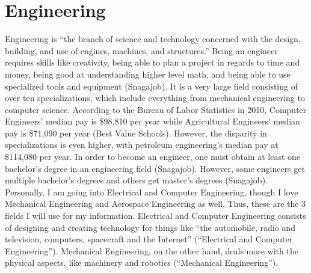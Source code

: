 \chapter{Engineering}

Engineering is “the branch of science and technology concerned with the design, building, and use of engines, machines, and structures.” Being an engineer requires skills like creativity, being able to plan a project in regards to time and money, being good at understanding higher level math, and being able to use specialized tools and equipment (Snagajob). It is a very large field consisting of over ten specializations, which include everything from mechanical engineering to computer science. According to the Bureau of Labor Statistics in 2010, Computer Engineers’ median pay is \$98,810 per year while Agricultural Engineers’ median pay is \$71,090 per year (Best Value Schools). However, the disparity in specializations is even higher, with petroleum engineering’s median pay at \$114,080 per year. In order to become an engineer, one must obtain at least one bachelor’s degree in an engineering field (Snagajob). However, some engineers get multiple bachelor’s degrees and others get master’s degrees (Snagajob). Personally, I am going into Electrical and Computer Engineering, though I love Mechanical Engineering and Aerospace Engineering as well. Thus, these are the 3 fields I will use for my information. Electrical and Computer Engineering consists of designing and creating technology for things like “the automobile, radio and television, computers, spacecraft and the Internet” (“Electrical and Computer Engineering”). Mechanical Engineering, on the other hand, deals more with the physical aspects, like machinery and robotics (“Mechanical Engineering”). 

